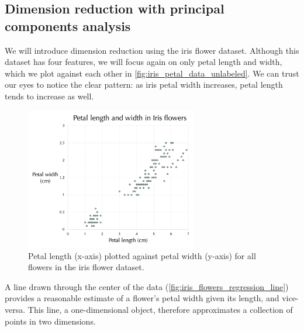 \FloatBarrier
{}
\subsection{Dimension reduction with principal components analysis}

We will introduce dimension reduction using the iris flower dataset. Although this dataset has four features, we will focus again on only petal length and width, which we plot against each other in \autoref{fig:iris_petal_data_unlabeled}. We can trust our eyes to notice the clear pattern: as iris petal width increases, petal length tends to increase as well.\\

\begin{figure}[h]
\centering
\mySfFamily
\includegraphics[width = 0.67\textwidth]{../images_CMYK/iris_petal_data_unlabeled}
\caption{Petal length (x-axis) plotted against petal width (y-axis) for all flowers in the iris flower dataset.}
\label{fig:iris_petal_data_unlabeled}
\end{figure}

A line drawn through the center of the data (\autoref{fig:iris_flowers_regression_line}) provides a reasonable estimate of a flower's petal width given its length, and vice-versa. This line, a one-dimensional object, therefore approximates a collection of points in two dimensions.\\

